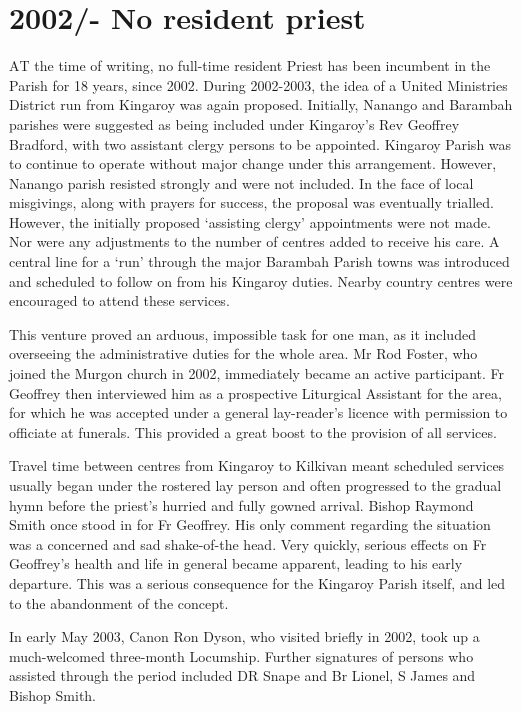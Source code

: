 \section{2002/- No resident priest}



\lettrine[lines=3]{A}{T}
 the time of writing, no full-time resident Priest has been incumbent in the Parish for 18 years, since 2002. During 2002-2003, the idea of a United Ministries District run from Kingaroy was again proposed. Initially, Nanango and Barambah parishes were suggested as being included under Kingaroy's Rev Geoffrey Bradford, with two assistant clergy persons to be appointed. Kingaroy Parish was to continue to operate without major change under this arrangement. However, Nanango parish resisted strongly and were not included. In the face of local misgivings, along with prayers for success, the proposal was eventually trialled. However, the initially proposed `assisting clergy' appointments were not made. Nor were any adjustments to the number of centres added to receive his care. A central line for a `run' through the major Barambah Parish towns was introduced and scheduled to follow on from his Kingaroy duties. Nearby country centres were encouraged to attend these services.

This venture proved an arduous, impossible task for one man, as it included overseeing the administrative duties for the whole area. Mr Rod Foster, who joined the Murgon church in 2002, immediately became an active participant. Fr Geoffrey then interviewed him as a prospective Liturgical Assistant for the area, for which he was accepted under a general lay-reader's licence with permission to officiate at funerals. This provided a great boost to the provision of all services.



Travel time between centres from Kingaroy to Kilkivan meant scheduled services usually began under the rostered lay person and often progressed to the gradual hymn before the priest's hurried and fully gowned arrival. Bishop Raymond Smith once stood in for Fr Geoffrey. His only comment regarding the situation was a concerned and sad shake-of-the head. Very quickly, serious effects on Fr Geoffrey's health and life in general became apparent, leading to his early departure. This was a serious consequence for the Kingaroy Parish itself, and led to the abandonment of the concept.



In early May 2003, Canon Ron Dyson, who visited briefly in 2002, took up a much-welcomed three-month Locumship. Further signatures of persons who assisted through the period included DR Snape and Br Lionel, S James and Bishop Smith.




